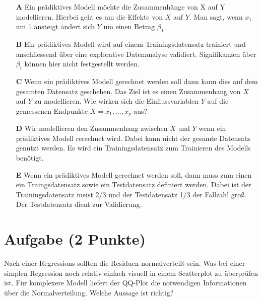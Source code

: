 \documentclass[a4paper, 9pt]{scrartcl}\usepackage[]{graphicx}\usepackage[]{xcolor}
\begin{document}
\begin{enumerate}
\item [\textbf{A} \msquare] Ein prädiktives Modell möchte die Zusammenhänge von X auf Y modellieren. Hierbei geht es um die Effekte von $X$ auf $Y$. Man sagt, wenn $x_1$ um 1 ansteigt ändert sich $Y$ um einen Betrag $\beta_1$.
\item [\textbf{B} \msquare] Ein prädiktives Modell wird auf einem Trainingsdatensatz trainiert und anschliessend über eine explorative Datenanalyse validiert. Signifikanzen über $\beta_i$ können hier nicht festgestellt werden.
\item [\textbf{C} \msquare] Wenn ein prädiktives Modell gerechnet werden soll dann kann dies auf dem gesamten Datensatz geschehen. Das Ziel ist es einen Zusammenhang von $X$ auf $Y$ zu modellieren. Wie wirken sich die Einflussvariablen $Y$ auf die gemessenen Endpunkte $X = x_1, ..., x_p$ aus?
\item [\textbf{D} \msquare] Wir modellieren den Zusammenhang zwischen $X$ und $Y$ wenn ein prädiktives Modell rerechnet wird. Dabei kann nicht der gesamte Datensatz genutzt werden. Es wird ein Trainingsdatensatz zum Trainieren des Modells benötigt.
\item [\textbf{E} \msquare] Wenn ein prädiktives Modell gerechnet werden soll, dann muss zum einen ein Traingsdatensatz sowie ein Testdatensatz definiert werden. Dabei ist der Trainingsdatensatz meist 2/3 und der Testdatensatz 1/3 der Fallzahl groß. Der Testdatensatz dient zur Validierung.
\end{enumerate}

\section{Aufgabe \hfill (2 Punkte)}



Nach einer Regressions sollten die Residuen normalverteilt sein. Was bei einer simplen Regression noch relativ einfach visuell in einem Scatterplot zu überprüfen ist. Für komplexere Modell liefert der QQ-Plot die notwendigen Informationen über die Normalverteilung. Welche Aussage ist richtig?
\end{document}
